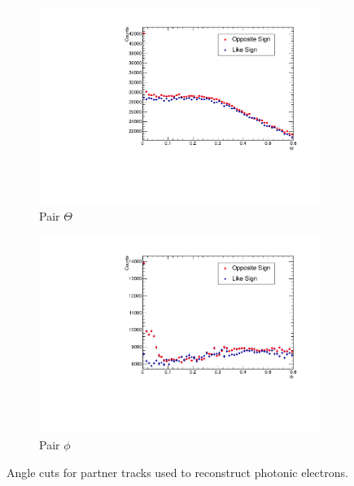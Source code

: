 \begin{figure}[htbp]
	\begin{center}
    \begin{subfigure}{0.65\textwidth}
        \includegraphics[width=\textwidth]{Plots/NPE/Theta_OS_LS.pdf}
        \caption{Pair $\Theta$}
        \label{fig:PE_Theta}
    \end{subfigure}
    \begin{subfigure}{0.65\textwidth}
        \includegraphics[width=\textwidth]{Plots/NPE/Phi_OS_LS.pdf}
        \caption{Pair $\phi$}
        \label{fig:PE_Phi}
    \end{subfigure}
	\end{center}
\caption[Angle Cuts for Phot. Electrons]{Angle cuts for partner tracks used to reconstruct photonic electrons.}
\label{fig:PE_angle}
\end{figure}

